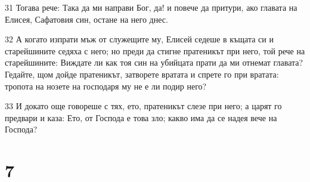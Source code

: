 \par 31 Тогава рече: Така да ми направи Бог, да! и повече да притури, ако главата на Елисея, Сафатовия син, остане на него днес.
\par 32 А когато изпрати мъж от служещите му, Елисей седеше в къщата си и старейшините седяха с него; но преди да стигне пратеникът при него, той рече на старейшините: Виждате ли как тоя син на убийцата прати да ми отнемат главата? Гедайте, щом дойде пратеникът, затворете вратата и спрете го при вратата: тропота на нозете на господаря му не е ли подир него?
\par 33 И докато още говореше с тях, ето, пратеникът слезе при него; а царят го предвари и каза: Ето, от Господа е това зло; какво има да се надея вече на Господа?

\chapter{7}

